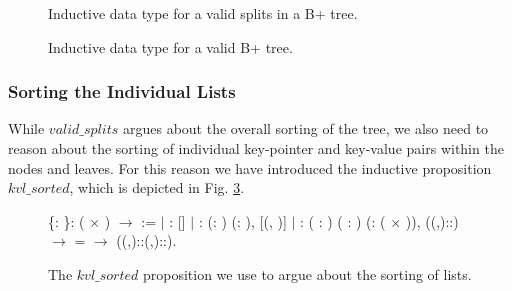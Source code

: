 \begin{figure}

\caption{Inductive data type for a valid splits in a B+ tree.}
\label{fig:inductive_valid_splits}
\end{figure}

\begin{figure}
\centering

\caption{Inductive data type for a valid B+ tree.}
\label{fig:inductive_valid_bplustree}
\end{figure}

\subsubsection{Sorting the Individual Lists}
\label{sec:Kvl_sorted}
While $valid\_splits$ argues about the overall sorting of the tree, we also need to reason about the sorting of individual key-pointer and key-value pairs within the nodes and leaves. For this reason we have introduced the inductive proposition $kvl\_sorted$, which is depicted in Fig. \ref{fig:kvl_sorted}.

\begin{figure}
  \begin{coqdoccode}
  \coqdocnoindent
    \{: \}:  ( \ensuremath{\times} ) \ensuremath{\rightarrow}  :=\coqdoceol
  \coqdocindent{1.00em}
  \ensuremath{|}
  :  []\coqdoceol
  \coqdocindent{1.00em}
  \ensuremath{|} : \coqdockw{\ensuremath{\forall}} (: ) (: ), \coqdoceol
  \coqdocindent{8.00em}
   [(, )]\coqdoceol
  \coqdocindent{1.00em}
  \ensuremath{|} : \coqdockw{\ensuremath{\forall}} ( : ) ( : ) (:  ( \ensuremath{\times} )), \coqdoceol
  \coqdocindent{8.00em}
   ((,)::) \ensuremath{\rightarrow} \coqdoceol
  \coqdocindent{8.00em}
     =  \ensuremath{\rightarrow}\coqdoceol
  \coqdocindent{8.00em}
   ((,)::(,)::).\coqdoceol
  \end{coqdoccode}
  \caption{The $kvl\_sorted$ proposition we use to argue about the sorting of lists.}
  \label{fig:kvl_sorted}
\end{figure}

